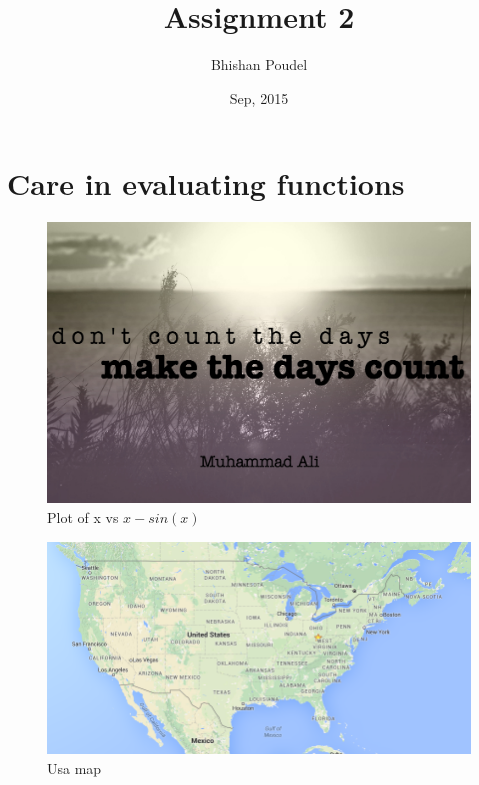 \documentclass[11pt,a4paper,english]{article}
\title{Assignment 2}
\author{Bhishan Poudel}
\date{Sep, 2015}
\begin{document}
\maketitle
\tableofcontents
\listoffigures
\clearpage

\section{Care in evaluating functions}

	\begin{figure}
	\centering
	\includegraphics[width=1.0\textwidth,left]{./images/a.jpg}
	\caption{Plot of x vs $x - sin(x)$ }
	\end{figure}
	
	
	\begin{figure}
	
	\includegraphics[width=1.0\textwidth,left]{./images/usa_map.png}
	\caption{Usa map }
	\end{figure}
\end{document}
